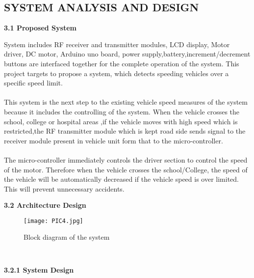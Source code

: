 \documentclass[a4paper,12pt, English]{article}
\newcommand\tab[1][1cm]{\hspace*{#1}}
\begin{document}
\begin{normalsize}
\begin{center}
\section{ \Large SYSTEM ANALYSIS AND DESIGN}
\end{center}

\begin{large}
\textbf{3.1 Proposed System}
\end{large}

\tab System includes RF receiver and transmitter modules, LCD display, Motor driver, DC motor, Arduino uno board, power supply,battery,increment/decrement buttons are interfaced together for the complete operation of the system.
This project targets to propose a system, which detects speeding vehicles over a specific speed limit.
\\
\\
\tab This system is the next step to the existing vehicle speed measures of the system because it includes the controlling of the system.  
When the vehicle crosses the school, college or hospital areas ,if the vehicle moves with high speed which is restricted,the RF transmitter module which is kept road side sends signal to the receiver module present in vehicle unit form that to the  micro-controller.
\\
\\
 The micro-controller immediately controls the driver section to control the speed of the motor. 
Therefore when the vehicle crosses the school/College, the speed of the vehicle will be automatically decreased if the vehicle speed is over limited. 
This will prevent unnecessary accidents.

\newpage
\begin{large}
\textbf{3.2 Architecture Design}
\end{large}
\begin{figure}[htb]
\begin{center}
\texttt{[image: PIC4.jpg]}
\end{center}
\begin{center}
\renewcommand{\thefigure}{3.2.1}
\caption{\footnotesize Block diagram of the system }
\end{center}
\end{figure}\\

\newpage
\begin{large}
\textbf{3.2.1 System Design}
\end{large}



\end{normalsize}
\end{document}

